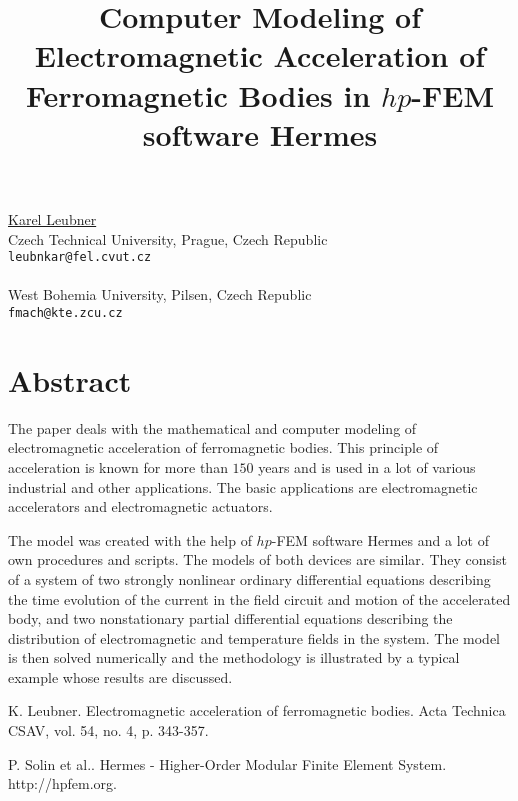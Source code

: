 \title{Computer Modeling of Electromagnetic Acceleration of Ferromagnetic Bodies in $hp$-FEM software Hermes}
\author{}  \institute{}
\maketitle
\begin{center}
{\large \underline{Karel Leubner}}\\
Czech Technical University, Prague, Czech Republic\\
{\tt leubnkar@fel.cvut.cz}
\\ \vspace{4mm}{\large Franti\v sek Mach}\\
West Bohemia University, Pilsen, Czech Republic\\
{\tt fmach@kte.zcu.cz}

\end{center}

\section*{Abstract}

The paper deals with the mathematical and computer modeling of electromagnetic acceleration of ferromagnetic bodies. This principle of acceleration is known for more than $150$ years and is used in a lot of various industrial and other applications. The basic applications are electromagnetic accelerators and electromagnetic actuators. \cite{eafb}

The model was created with the help of $hp$-FEM software Hermes \cite{hermesxx} and a lot of own procedures and scripts. The models of both devices are similar. They consist of a system of two strongly nonlinear ordinary differential equations describing the time evolution of the current in the field circuit and motion of the accelerated body, and two nonstationary partial differential equations describing the distribution of electromagnetic and temperature fields in the system. The model is then solved numerically and the methodology is illustrated by a typical example whose results are discussed.


\begin{thebibliography}{10}

{\sc K. Leubner}. {Electromagnetic acceleration of ferromagnetic bodies}. Acta Technica CSAV, vol. 54, no. 4, p. 343-357.



{\sc P. Solin et al.}. {Hermes - Higher-Order Modular Finite Element System}. http://hpfem.org.

\end{thebibliography}
